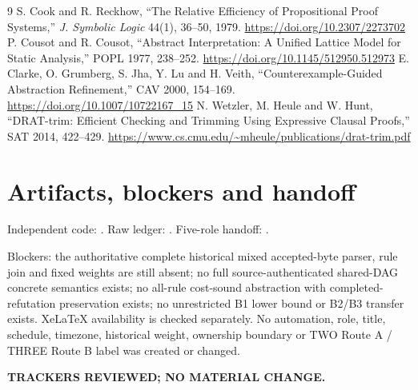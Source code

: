 \documentclass[11pt]{article}
\begin{document}
\begin{thebibliography}{9}
 S. Cook and R. Reckhow, ``The Relative Efficiency of Propositional Proof Systems,'' \emph{J. Symbolic Logic} 44(1), 36--50, 1979. \url{https://doi.org/10.2307/2273702}
 P. Cousot and R. Cousot, ``Abstract Interpretation: A Unified Lattice Model for Static Analysis,'' POPL 1977, 238--252. \url{https://doi.org/10.1145/512950.512973}
 E. Clarke, O. Grumberg, S. Jha, Y. Lu and H. Veith, ``Counterexample-Guided Abstraction Refinement,'' CAV 2000, 154--169. \url{https://doi.org/10.1007/10722167_15}
 N. Wetzler, M. Heule and W. Hunt, ``DRAT-trim: Efficient Checking and Trimming Using Expressive Clausal Proofs,'' SAT 2014, 422--429. \url{https://www.cs.cmu.edu/~mheule/publications/drat-trim.pdf}
\end{thebibliography}

\section*{Artifacts, blockers and handoff}
Independent code:
.  Raw ledger:
.  Five-role handoff:
.

Blockers: the authoritative complete historical mixed accepted-byte parser, rule join and fixed weights are still absent; no full source-authenticated shared-DAG concrete semantics exists; no all-rule cost-sound abstraction with completed-refutation preservation exists; no unrestricted B1 lower bound or B2/B3 transfer exists.  XeLaTeX availability is checked separately.  No automation, role, title, schedule, timezone, historical weight, ownership boundary or TWO Route A / THREE Route B label was created or changed.

\noindent\textbf{TRACKERS REVIEWED; NO MATERIAL CHANGE.}
\end{document}
